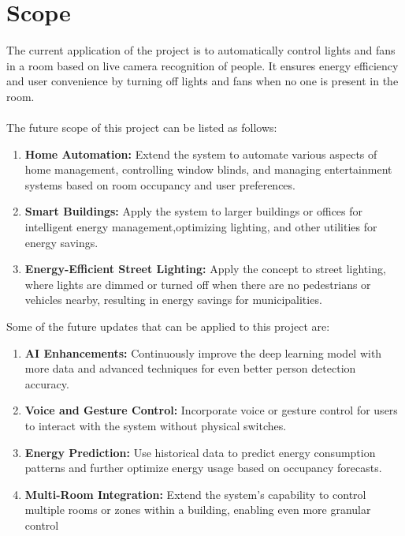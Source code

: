 \documentclass[12pt,a4paper]{report}
\begin{document}
\section*{Scope}
The current application of the project is to automatically control lights and fans in a room
based on live camera recognition of people. It ensures energy efficiency and user convenience
by turning off lights and fans when no one is present in the room. \\ \\
The future scope of this project can be listed as follows:
 \begin{enumerate}
     \item \textbf{Home Automation:} Extend the system to automate various aspects of home management, controlling window blinds, and managing entertainment systems based on room occupancy and user preferences.
     \item \textbf{Smart Buildings:} Apply the system to larger buildings or offices for intelligent energy management,optimizing lighting, and other utilities for energy savings.
     \item \textbf{Energy-Efficient Street Lighting:} Apply the concept to street lighting, where lights are dimmed or turned off when there are no pedestrians or vehicles nearby, resulting in energy savings for municipalities.
 \end{enumerate}
Some of the future updates that can be applied to this project are:
 \begin{enumerate}
     \item \textbf{AI Enhancements:} Continuously improve the deep learning model with more data and advanced techniques for even better person detection accuracy.
     \item \textbf{Voice and Gesture Control:} Incorporate voice or gesture control for users to interact with the system without physical switches.
     \item \textbf{Energy Prediction:} Use historical data to predict energy consumption patterns and further optimize energy usage based on occupancy forecasts.
     \item \textbf{Multi-Room Integration:} Extend the system's capability to control multiple rooms or zones within a building, enabling even more granular control
 \end{enumerate}
\end{document}
